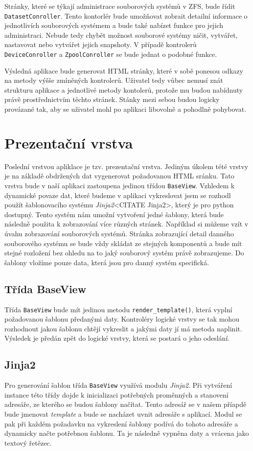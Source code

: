     Stránky, které se týkají administrace souborových systémů v ZFS, bude řídit \verb|DatasetConroller|. Tento kontorlér bude umožňovat zobrait detailní informace o jednotlivích souborových systémem a bude také nabízet funkce pro jejich administraci. Nebude tedy chybět možnost souborové systémy ničit, vytvářet, nastavovat nebo vytvářet jejich snapshoty.
    V případě kontrolerů \verb|DeviceConroller| a \verb|ZpoolConroller| se bude jednat o podobné funkce.
    
    Výsledná aplikace bude generovat HTML stránky, které v sobě ponesou odkazy na metody výšše zmíněných kontrolerů. Uživatel tedy vůbec nemusí znát strukturu aplikace a jednotlivé metody kontolerů, protože mu budou nabídnuty právě prostřednictvím těchto stránek. Stánky mezi sebou budou logicky provázané tak, aby se uživatel mohl po aplikaci libovolně a pohodlně pohybovat.

\section{Prezentační vrstva}
Poslední vrstvou apliklace je tzv. prezentační vrstva. Jediným úkolem tété vrstvy je na základě obdržených dat vygenerovat požadovanou HTML sránku. Tato vrstva bude v naší aplikaci zastoupena jedinou třídou \verb|BaseView|. Vzhledem k dynamické povaze dat, které budeme v aplikaci vykreslovat jsem se rozhodl použít šablonovacího systému \emph{Jinja2}<CITATE Jinja2>, který je pro python dostupný. Tento systém nám umožní vytvoření jedné šablony, která bude následně použita k zobrazování více různých stránek. Například si můžeme vzít v úvahu zobrazování souborových systémů. Stránka zobrazující detail danného souborového systému se bude vždy skládat ze stejných komponentů a bude mít stejné rozložení bez ohledu na to jaký souborový systém právě zobrazujeme. Do šablony vložíme pouze data, která jsou pro danný systém specifická.
    \subsection{Třída BaseView}
    Třída \verb|BaseView| bude mít jedinou metodu \verb|render_template()|, která vyplní požadovanou šablonu předanými daty. Kontroléry logické vrstvy se tak mohou rozhodnout jakou šablonu chtějí vykreslit a jakými daty jí má metoda naplinit. Výsledek je předán zpět do logické vrstvy, která se postará o jeho odeslání.
    \subsection{Jinja2}
    Pro generování šablon třída \verb|BaseView| využívá modulu \emph{Jinja2}. Při vytváření instance této třídy dojde k inicializaci potřebných proměnných a stanovení adresáře, ze kterého se budou šablony načítat. Tento adresář se v našem příapdě bude jmenovat \emph{template} a bude se nacházet uvnit adresáře s aplikací. Modul se pak při každém požadavku na vykreslení šablony podívá do tohoto adresáře a dynamicky načte potřebnou šablonu. Ta je následně vypněna daty a vrácena jako textový řetězec.

